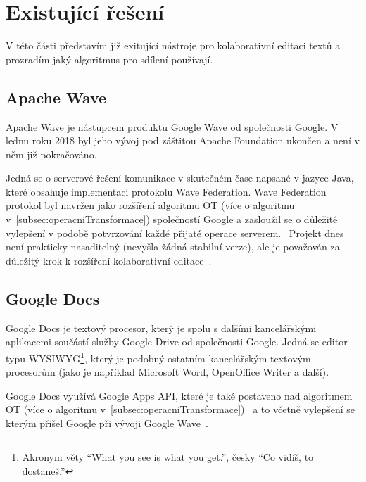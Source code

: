
\section{Existující řešení}\label{sec:existujícíŘešení}
V této části představím již exitující nástroje pro kolaborativní editaci textů a prozradím jaký algoritmus pro sdílení používají.

\subsection{Apache Wave}\label{subsec:apacheWave}
Apache Wave je nástupcem produktu Google Wave od společnosti Google.
V lednu roku 2018 byl jeho vývoj pod záštitou Apache Foundation ukončen a není v něm již pokračováno.~\cite{wave:apache}

Jedná se o serverové řešení komunikace v skutečném čase napsané v jazyce Java, které obsahuje implementaci protokolu Wave Federation.
Wave Federation protokol byl navržen jako rozšíření algoritmu \gls{OT} (více o algoritmu v~\ref{subsec:operacniTransformace}) společností Google a zasloužil se o důležité vylepšení v podobě potvrzování každé přijaté operace serverem.~\cite{wave:apache, wave:google}
Projekt dnes není prakticky nasaditelný (nevyšla žádná stabilní verze), ale je považován za důležitý krok k rozšíření kolaborativní editace~\cite{ot:codecommit}.

\subsection{Google Docs}\label{subsec:googleDocs}
Google Docs je textový procesor, který je spolu s dalšími kancelářskými aplikacemi součástí služby Google Drive od společnosti Google.
Jedná se editor typu WYSIWYG\footnote{Akronym věty \enquote{What you see is what you get.}, česky \enquote{Co vidíš, to dostaneš.}}, který je podobný ostatním kancelářským textovým procesorům (jako je například Microsoft Word, OpenOffice Writer a další).~\cite{docs:top10}

Google Docs využívá Google Apps API, které je také postaveno nad algoritmem \gls{OT} (více o algoritmu v~\ref{subsec:operacniTransformace})~\cite{docs:conflict} a to včetně vylepšení se kterým přišel Google při vývoji Google Wave~\cite{docs:appsConf}.

